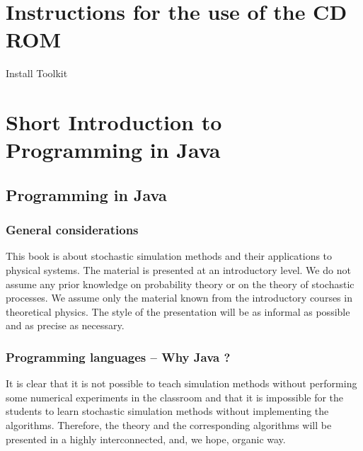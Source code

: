 \chapter*{Instructions for the use of the CD ROM}
Install Toolkit




\chapter{Short Introduction to Programming in Java}

\section{Programming in Java}
\label{sec:Programming}


\subsection{General considerations}
\label{sec:General_considerations}
This book is about stochastic simulation methods and their applications to
physical systems. The material is presented at an introductory level. We do 
not assume any prior knowledge on probability theory or on the theory of 
stochastic processes. We assume only the material known from the introductory 
courses in theoretical physics. The style of the presentation will be as 
informal as possible and as precise as necessary.



\subsection{Programming languages -- Why Java ?}
\label{sec:Programming_languages}
It is clear that it is not possible to teach simulation methods without 
performing some numerical experiments in the classroom and that it is 
impossible for the students to learn stochastic simulation methods without 
implementing the algorithms. Therefore, the theory and the corresponding 
algorithms will be presented in a highly interconnected, and, we 
hope, organic way.

